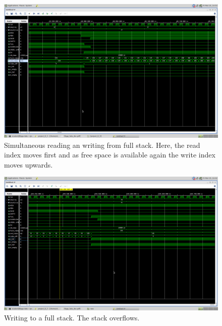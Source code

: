 \begin{figure}
    \includegraphics[width=.9\textwidth]{L8/E3/read_write_from_full.png}
    \caption{Simultaneous reading an writing from full stack. Here, the read index moves first and as free space is available again the write index moves upwards.}
    \label{pic: r and e from f stack fifo}
\end{figure}

\begin{figure}
    \includegraphics[width=.9\textwidth]{L8/E3/write_overflow.png}
    \caption{Writing to a full stack. The stack overflows.}
    \label{pic: r to f stack fifo}
\end{figure}